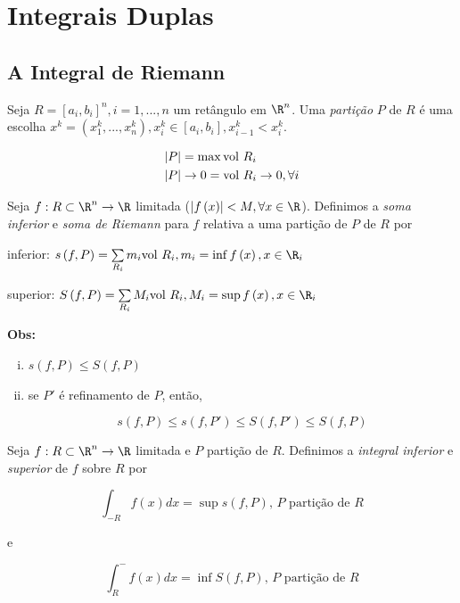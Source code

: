 \documentclass[11pt, oneside, a4paper]{gsm-l}
\begin{document}
\chapter{Integrais Duplas} \label{chap06}

\section{A Integral de Riemann} \label{sec27}

\begin{defi}
Seja $R = \left[ {a_i ,b_i } \right]^n ,i = 1,...,n$ um ret\^angulo em $\R^n$. Uma \textit{partição} $P$ de $R$ é uma escolha $x^k  = \left( {x_1^k ,...,x_n^k } \right),x_i^k  \in \left[ {a_i ,b_i } \right],x_{i - 1}^k  < x_i^k$.

\[
\begin{gathered}
  \left| P \right| = \max {\text{vol }}R_i  \hfill \\
  \left| P \right| \to 0 = {\text{vol }}R_i  \to 0,\forall i \hfill \\
\end{gathered}
\]

\end{defi}

\begin{defi}
Seja $f:R \subset \R^n  \to \R$ limitada ($\left| {f\left( x \right)} \right| < M,\forall x \in \R$). Definimos a \textit{soma inferior} e \textit{soma de Riemann} para $f$ relativa a uma partição de $P$ de $R$ por

inferior: $s\left( {f,P} \right) = \sum\limits_{R_i }^{} {m_i {\text{vol }}R_i } ,m_i  = \inf f\left( x \right),x \in \R_i$

superior: $S\left( {f,P} \right) = \sum\limits_{R_i }^{} {M_i {\text{vol }}R_i } ,M_i  = \sup f\left( x \right),x \in \R_i$
\end{defi}

\textbf{Obs:}

\begin{enumerate}[(i)]
  \item $s\left( {f,P} \right) \leqslant S\left( {f,P} \right)$
  \item se $P'$ é refinamento de $P$, então,

\[
s\left( {f,P} \right) \leqslant s\left( {f,P'} \right) \leqslant S\left( {f,P'} \right) \leqslant S\left( {f,P} \right)
\]

\end{enumerate}

\begin{defi}
Seja $f:R \subset \R^n \to \R$ limitada e $P$ partição de $R$. Definimos a \textit{integral inferior} e \textit{superior} de $f$ sobre $R$ por

\[
\int_{-R} {f(x)dx} = \sup s(f,P),\,P \text{ partição de } R
\]

e

\[
\int_{R}^- {f(x)dx} = \inf S(f,P),\,P \text{ partição de } R
\]

\end{defi}
\end{document}
